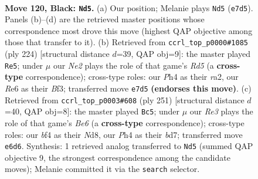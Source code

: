 \documentclass[11pt]{article}
\begin{document}
\clearpage

\begin{figure}[p]\centering
\begin{subfigure}{0.46\textwidth}\centering
\resizebox{\linewidth}{!}{%
\newchessgame
\chessboard[
  setfen={k7/4n2K/p3r3/P4p2/5B1p/N5Pb/8/R7 b - - 1 120},
  showmover=false,
  pgfstyle=straightmove, color=movearrow, markmove={e7-d5}
]}
\caption{}
\end{subfigure}\hfill
\begin{subfigure}{0.46\textwidth}\centering
\resizebox{\linewidth}{!}{%
\newchessgame
\chessboard[
  setfen={8/K5k1/p5p1/P2R2P1/8/5B2/r7/5b2 w - - 80 113},
  showmover=false,
  pgfstyle=straightmove, color=movearrow, markmove={d5-e5}
]}
\caption{}
\end{subfigure}
\\[4pt]
\begin{subfigure}{0.46\textwidth}\centering
\resizebox{\linewidth}{!}{%
\newchessgame
\chessboard[
  setfen={3n4/3B1p2/2p2p1k/4p3/4P1P1/2P1b3/4K3/4N3 b - - 41 126},
  showmover=false,
  pgfstyle=straightmove, color=movearrow, markmove={e3-c5}
]}
\caption{}
\end{subfigure}\hfill

\caption{\textbf{Move 120, Black: \texttt{Nd5}.} (a) Our position; Melanie plays \texttt{Nd5} (\texttt{e7d5}). Panels (b)--(d) are the retrieved master positions whose correspondence most drove this move (highest QAP objective among those that transfer to it). (b) Retrieved from \texttt{ccrl\_top\_p0000\#1085} (ply 224) [structural distance $d$=39, QAP obj=9]: the master played \texttt{Re5}; under $\mu$ our \emph{Ne2} plays the role of that game's \emph{Rd5} (a \textbf{cross-type} correspondence); cross-type roles: our \emph{P}h4 as their \emph{r}a2, our \emph{R}e6 as their \emph{B}f3; transferred move \texttt{e7d5} \textbf{(endorses this move)}. (c) Retrieved from \texttt{ccrl\_top\_p0003\#608} (ply 251) [structural distance $d$=40, QAP obj=8]: the master played \texttt{Bc5}; under $\mu$ our \emph{Re3} plays the role of that game's \emph{Be6} (a \textbf{cross-type} correspondence); cross-type roles: our \emph{b}f4 as their \emph{N}d8, our \emph{P}h4 as their \emph{b}d7; transferred move \texttt{e6d6}. Synthesis: 1 retrieved analog transferred to \texttt{Nd5} (summed QAP objective 9, the strongest correspondence among the candidate moves); Melanie committed it via the \texttt{search} selector.}
\label{fig:thought-m239}
\end{figure}

\clearpage
\end{document}
